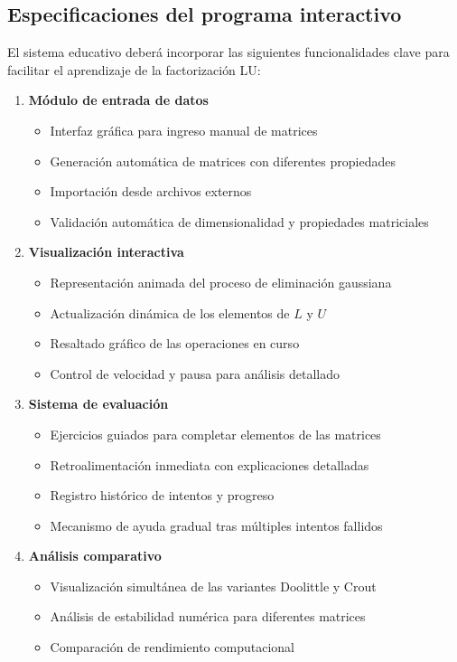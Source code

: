 \subsection{Especificaciones del programa interactivo}

El sistema educativo deberá incorporar las siguientes funcionalidades clave para facilitar el aprendizaje de la factorización LU:

\begin{enumerate}
	\item \textbf{Módulo de entrada de datos}
	\begin{itemize}
		\item Interfaz gráfica para ingreso manual de matrices
		\item Generación automática de matrices con diferentes propiedades
		\item Importación desde archivos externos
		\item Validación automática de dimensionalidad y propiedades matriciales
	\end{itemize}
	
	\item \textbf{Visualización interactiva}
	\begin{itemize}
		\item Representación animada del proceso de eliminación gaussiana
		\item Actualización dinámica de los elementos de $L$ y $U$
		\item Resaltado gráfico de las operaciones en curso
		\item Control de velocidad y pausa para análisis detallado
	\end{itemize}
	
	\item \textbf{Sistema de evaluación}
	\begin{itemize}
		\item Ejercicios guiados para completar elementos de las matrices
		\item Retroalimentación inmediata con explicaciones detalladas
		\item Registro histórico de intentos y progreso
		\item Mecanismo de ayuda gradual tras múltiples intentos fallidos
	\end{itemize}
	
	\item \textbf{Análisis comparativo}
	\begin{itemize}
		\item Visualización simultánea de las variantes Doolittle y Crout
		\item Análisis de estabilidad numérica para diferentes matrices
		\item Comparación de rendimiento computacional
	\end{itemize}
	

\end{enumerate}
